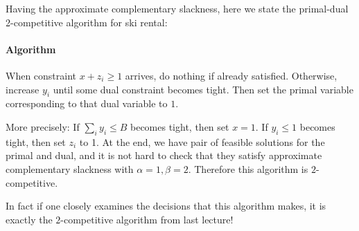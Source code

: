 \documentclass[11pt]{article}
\begin{document}
Having the approximate complementary slackness, here we state the primal-dual 2-competitive algorithm for ski rental:

\paragraph{Algorithm}
When constraint $x+z_i \geq 1$ arrives, do nothing if already satisfied.
Otherwise, increase $y_i$ until some dual constraint becomes tight. Then set the primal variable corresponding to that dual variable to $1$.

More precisely:
If $\sum_i y_i \leq B$ becomes tight, then set $x = 1$.
If $y_i \leq 1$ becomes tight, then set $z_i$ to 1.
At the end, we have pair of feasible solutions for the primal and dual, and it is not hard to check that they satisfy approximate complementary slackness with $\alpha=1, \beta = 2$. Therefore this algorithm is $2$-competitive.

In fact if one closely examines the decisions that this algorithm makes, it is exactly the $2$-competitive algorithm from last lecture!
\end{document}
